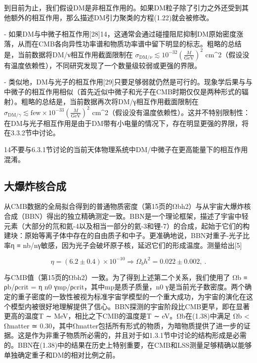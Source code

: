 到目前为止，我们假设DM是非相互作用的。如果DM粒子除了引力之外还受到其他额外的相互作用，那么描述DM引力聚类的方程(1.22)就会被修改。

- 如果DM与中微子相互作用[28]14，这通常会通过碰撞阻尼抑制DM原始密度涨落，从而在CMB各向异性功率谱和物质功率谱中留下明显的标志。粗略的总结是，当前数据将DM/ν相互作用截面限制在 \( \sigma_{\text{DM}/\nu} \lesssim 10^{-32} (\frac{M}{\text{GeV}})^2 \) cm^2（假设没有温度依赖性），不同研究发现了一个数量级较弱或更强的界限。

- 类似地，DM与光子的相互作用[29]只要足够弱就仍然是可行的。现象学后果与与中微子的相互作用相似（首先近似中微子和光子在CMB时期仅仅是两种形式的辐射）。粗略的总结是，当前数据再次将DM/γ相互作用截面限制在 \( \sigma_{\text{DM}/\gamma} \lesssim \text{few} \times 10^{-33} (\frac{M}{\text{GeV}})^2 \) cm^2（假设没有温度依赖性）。这并不特别限制性：在DM与光子相互作用是由于DM带有小电量的情况下，存在明显更强的界限，将在3.3.2节中讨论。

14不要与6.3.1节讨论的当前天体物理系统中DM/中微子在更高能量下的相互作用混淆。

\subsection{大爆炸核合成} 

从CMB数据的全局拟合得到的普通物质密度（第15页的Ωbh2）与从宇宙大爆炸核合成（BBN）得出的独立精确测定一致。BBN是一个理论框架，描述了宇宙中轻元素（大部分的氘和氦-4以及相当一部分的氦-3和锂-7）的合成，起始于它们的构建块：原始等离子体中存在的自由质子和中子。更准确地说，BBN对重子-光子比率η ≡ nb/nγ敏感，因为光子会破坏原子核，延迟它们的形成温度。测量给出[5]

\[ \eta = (6.2 \pm 0.4) \times 10^{-10} \Rightarrow \Omega_b h^2 = 0.022 \pm 0.002,~. \]

与CMB值（第15页的Ωbh2）一致。为了得到上述第二个关系，我们使用了 Ωb ≡ ρb/ρcrit = η n0 γmp/ρcrit，其中mp是质子质量，n0 γ是当前光子数密度。两个确定的重子密度的一致性被视为标准宇宙学模型的一个重大成功，为宇宙的演化在这个模型内被很好地理解提供了信心。BBN探测的宇宙阶段比CMB更早，即在显著更高的温度T ∼ MeV，相比之下CMB的温度是T ∼ eV。Ωb在(1.38)中满足 Ωb < Ωmatter ≃ 0.30，其中Ωmatter包括所有形式的物质，为暗物质提供了进一步的证据。这是作为非重子物质所必需的，并且对于如1.3.1节中讨论的结构形成是必需的。BBN在(1.38)中的结果在历史上特别重要，在CMB和LSS测量足够精确以能够单独确定重子和DM的相对比例之前。






